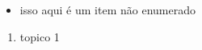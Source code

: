 \documentclass[a4paper, 12pt]{article}
\begin{document}
	\begin{itemize}
		\item isso aqui é um item não enumerado
	\end{itemize}
	\begin{enumerate}
		\item topico 1
	\end{enumerate}
	
\end{document}
